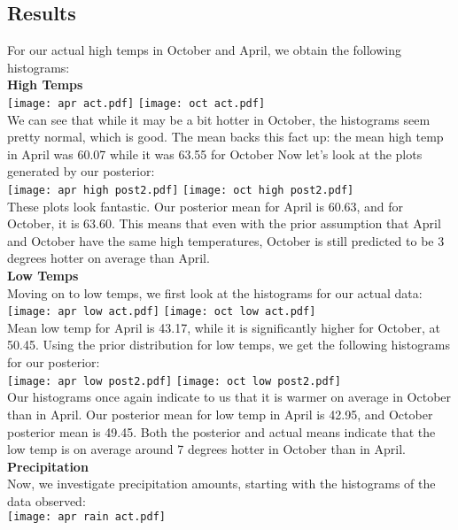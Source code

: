 \documentclass[12pt]{article}
\begin{document}
\begin{flushleft}
\section{Results}\label{sec:chapter}
For our actual high temps in October and April, we obtain the following histograms:\\
\textbf{High Temps}\\
\texttt{[image: apr act.pdf]}
\texttt{[image: oct act.pdf]}\\
We can see that while it may be a bit hotter in October, the histograms seem pretty normal, which is good. The mean backs this fact up: the mean high temp in April was 60.07 while it was 63.55 for October Now let's look at the plots generated by our posterior:\\
\texttt{[image: apr high post2.pdf]}
\texttt{[image: oct high post2.pdf]}\\
These plots look fantastic. Our posterior mean for April is 60.63, and for October, it is 63.60. This means that even with the prior assumption that April and October have the same high temperatures, October is still predicted to be 3 degrees hotter on average than April.\\
\textbf{Low Temps}\\
Moving on to low temps, we first look at the histograms for our actual data:\\
\texttt{[image: apr low act.pdf]}
\texttt{[image: oct low act.pdf]}\\
Mean low temp for April is 43.17, while it is significantly higher for October, at 50.45. Using the prior distribution for low temps, we get the following histograms for our posterior:\\
\texttt{[image: apr low post2.pdf]}
\texttt{[image: oct low post2.pdf]}\\
Our histograms once again indicate to us that it is warmer on average in October than in April. Our posterior mean for low temp in April is 42.95, and October posterior mean is 49.45. Both the posterior and actual means indicate that the low temp is on average around 7 degrees hotter in October than in April.\\ 
\textbf{Precipitation}\\
Now, we investigate precipitation amounts, starting with the histograms of the data observed:\\
\texttt{[image: apr rain act.pdf]}

\end{flushleft}
\end{document}
